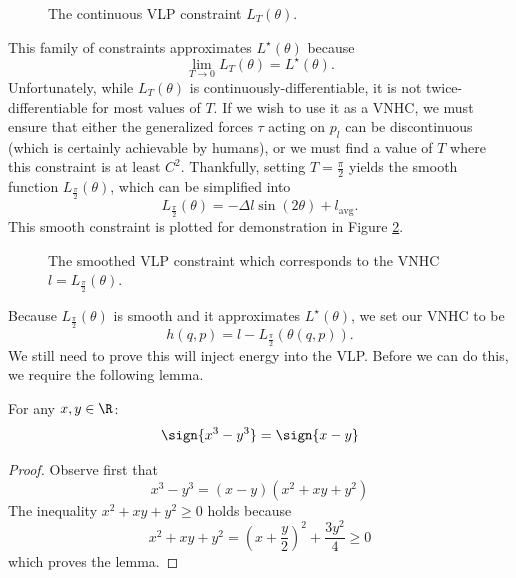 \begin{figure}
   \centering
   
   \caption{The continuous VLP constraint \(L_T(\theta)\).}\label{fig:vlp-T-controller}
\end{figure}

This family of constraints approximates \(L^\star(\theta)\) because 
\[
   \lim\limits_{T \rightarrow 0} L_T(\theta) = L^\star(\theta)
   .
\]
Unfortunately, while \(L_T(\theta)\) is continuously-differentiable, 
it is not twice-differentiable for most values of \(T\).
If we wish to use it as a VNHC, we must ensure that either the generalized
forces \(\tau\) acting on \(p_l\) can be discontinuous (which is certainly
achievable by humans), or we must find a value of \(T\) where this constraint is
at least \(C^2\).
Thankfully, setting \(T = \frac{\pi}{2}\) yields the smooth function 
\(L_{\frac{\pi}{2}}(\theta)\), which can be simplified into
\begin{equation}\label{eqn:vlp-smoothed-controller}
   L_\frac{\pi}{2}(\theta) = -\Delta l \sin(2\theta) + l_{\text{avg}}
   .
\end{equation}
This smooth constraint is plotted for demonstration in Figure
\ref{fig:vlp-smoothed-controller}.

\begin{figure}
   \centering
   
   \caption{The smoothed VLP constraint which corresponds to the VNHC 
      \(l = L_\frac{\pi}{2}(\theta)\).}\label{fig:vlp-smoothed-controller}
\end{figure}

Because \(L_\frac{\pi}{2}(\theta)\) is smooth and it approximates
\(L^\star(\theta)\), we set our VNHC to be
\[
   h(q,p) = l - L_\frac{\pi}{2}\left(\theta(q,p)\right)
   .
\]
We still need to prove this will inject energy into the VLP. 
Before we can do this, we require the following lemma.

\begin{lemma}\label{lemma:sign-of-cube}
   For any \(x,y \in \R\):
   \[
      \sign{x^3 - y^3} = \sign{x-y}
   \]
\end{lemma}
\begin{proof}
   Observe first that
   \[
      x^3 - y^3 =  (x-y)(x^2 + xy + y^2)
   \]
   The inequality \(x^2 + xy + y^2 \geq 0\) holds because
   \[
      x^2 + xy + y^2 = \left(x  + \frac{y}{2}\right)^2 + \frac{3y^2}{4} \geq 0
   \]
   which proves the lemma.
\end{proof}

